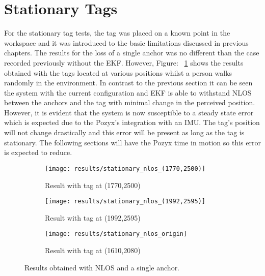 \section{Stationary Tags}\label{sec:stationary-tags}
For the stationary tag tests, the tag was placed on a known point in the workspace and it was introduced to the basic limitations discussed in previous chapters.
The results for the loss of a single anchor was no different than the case recorded previously without the EKF.
However, Figure: ~\ref{fig:stat_anchors} shows the results obtained with the tags located at various positions whilst a person walks randomly in the environment.
In contrast to the previous section it can be seen the system with the current configuration and EKF is able to withstand NLOS between the anchors and the tag with minimal change in the perceived position.
However, it is evident that the system is now susceptible to a steady state error which is expected due to the Pozyx's integration with an IMU.
The tag's position will not change drastically and this error will be present as long as the tag is stationary.
The following sections will have the Pozyx time in motion so this error is expected to reduce.

\begin{figure}[h!]
    \centering
    \begin{subfigure}{0.49\textwidth}
            \texttt{[image: results/stationary\_nlos\_(1770,2500)]}
            \caption{Result with tag at (1770,2500)}
    \end{subfigure}
    \begin{subfigure}{0.49\textwidth}
            \texttt{[image: results/stationary\_nlos\_(1992,2595)]}
            \caption{Result with tag at (1992,2595)}
    \end{subfigure}
    \begin{subfigure}{0.5\textwidth}
            \texttt{[image: results/stationary\_nlos\_origin]}
            \caption{Result with tag at (1610,2080)}
    \end{subfigure}
    \caption{Results obtained with NLOS and a single anchor.}
    \label{fig:stat_anchors}
\end{figure}
\newpage
